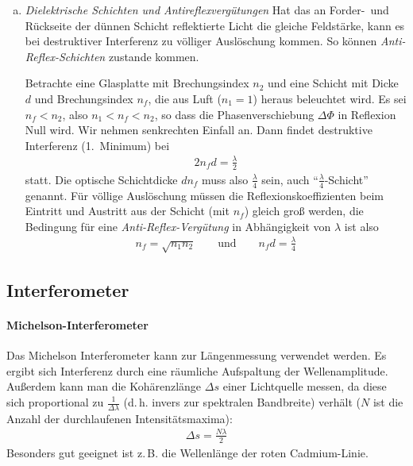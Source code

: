 \begin{enumerate}[a)]
\item \emph{Dielektrische Schichten und Antireflexvergütungen}
  Hat das an Forder-~und Rückseite der dünnen Schicht reflektierte Licht
  die gleiche Feldstärke, kann es bei destruktiver Interferenz zu
  völliger Auslöschung kommen. 
  So können \emph{Anti-Reflex-Schichten}
  zustande kommen.

  Betrachte eine Glasplatte mit Brechungsindex $n_2$ und eine Schicht
  mit Dicke $d$ und Brechungsindex $n_f$, die aus Luft ($n_1=1$) heraus
  beleuchtet wird. Es sei $n_f<n_2$, also $n_1<n_f<n_2$, so dass die
  Phasenverschiebung $\Delta\Phi$ in Reflexion Null wird.
  Wir nehmen senkrechten Einfall an. Dann findet destruktive
  Interferenz (1.~Minimum) bei
  \begin{gather*}
    2n_fd = \frac{\lambda}{2}
  \end{gather*}
  statt. Die optische Schichtdicke $dn_f$ muss also
  $\frac{\lambda}{4}$ sein, auch \enquote{$\frac{\lambda}{4}$-Schicht}
  genannt.
  Für völlige Auslöschung müssen die Reflexionskoeffizienten beim
  Eintritt und Austritt aus der Schicht (mit $n_f$) gleich groß
  werden, die Bedingung für eine 
  \emph{Anti-Reflex-Vergütung} in
  Abhängigkeit von $\lambda$ ist also
  \begin{gather*}
    n_f = \sqrt{n_1n_2} 
    \qquad\text{und}\qquad
    n_fd = \frac{\lambda}{4}
  \end{gather*}

\end{enumerate}


\subsection{Interferometer}
\paragraph{Michelson-Interferometer}%

Das Michelson Interferometer kann zur Längenmessung verwendet werden.
Es ergibt sich Interferenz durch eine räumliche Aufspaltung der
Wellenamplitude.
Außerdem kann man die Kohärenzlänge $\Delta s$ einer Lichtquelle
messen, da diese sich proportional zu $\frac{1}{\Delta\lambda}$
(d.\,h. invers zur spektralen Bandbreite) verhält ($N$ ist die Anzahl
der durchlaufenen Intensitätsmaxima):
\begin{gather*}
\Delta s = \frac{N\lambda}{2}
\end{gather*}
Besonders gut geeignet ist z.\,B. die Wellenlänge der roten Cadmium-Linie.

